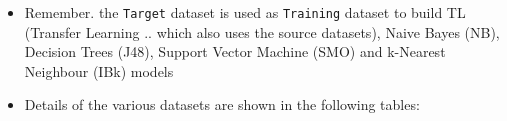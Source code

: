 \documentclass[a4paper,12pt, english]{article}
\begin{document}
\begin{itemize}
\item Remember. the \texttt{Target} dataset is used as \texttt{Training} dataset to build TL (Transfer Learning .. which also uses the source datasets), Naive Bayes (NB), Decision Trees (J48), Support Vector Machine (SMO) and k-Nearest Neighbour (IBk) models
\item Details of the various datasets are shown in the following tables:


\end{itemize}
\end{document}
